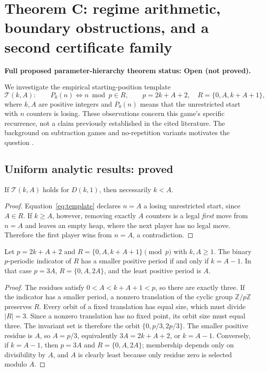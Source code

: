 \section{Theorem C: regime arithmetic, boundary obstructions, and a second certificate family}\label{sec:C}
\textbf{Full proposed parameter-hierarchy theorem status: Open (not proved).}

We investigate the empirical starting-position template
\begin{equation}\label{eq:template}
\mathcal{T}(k,A):\qquad P_0(n)\iff n\bmod p\in R,\qquad
p=2k+A+2,\quad R=\{0,A,k+A+1\},
\end{equation}
where $k,A$ are positive integers and $P_0(n)$ means that the unrestricted start with $n$ counters is losing. These observations concern this game's specific recurrence, not a claim previously established in the cited literature. The background on subtraction games and no-repetition variants motivates the question \cite{winningways2001,gurvich2012}.

\subsection{Uniform analytic results: proved}
\begin{proposition}\label{prop:Cupper}
If $\mathcal{T}(k,A)$ holds for $D(k,1)$, then necessarily $k<A$.
\end{proposition}
\begin{proof}
Equation~\eqref{eq:template} declares $n=A$ a losing unrestricted start, since $A\in R$. If $k\ge A$, however, removing exactly $A$ counters is a legal \emph{first} move from $n=A$ and leaves an empty heap, where the next player has no legal move. Therefore the first player wins from $n=A$, a contradiction.
\end{proof}

\begin{proposition}\label{prop:Ccollapse}
Let $p=2k+A+2$ and $R=\{0,A,k+A+1\}\pmod p$ with $k,A\ge1$. The binary $p$-periodic indicator of $R$ has a smaller positive period if and only if $k=A-1$. In that case $p=3A$, $R=\{0,A,2A\}$, and the least positive period is $A$.
\end{proposition}
\begin{proof}
The residues satisfy $0<A<k+A+1<p$, so there are exactly three. If the indicator has a smaller period, a nonzero translation of the cyclic group $\mathbb Z/p\mathbb Z$ preserves $R$. Every orbit of a fixed translation has equal size, which must divide $|R|=3$. Since a nonzero translation has no fixed point, its orbit size must equal three. The invariant set is therefore the orbit $\{0,p/3,2p/3\}$. The smaller positive residue is $A$, so $A=p/3$, equivalently $3A=2k+A+2$, or $k=A-1$. Conversely, if $k=A-1$, then $p=3A$ and $R=\{0,A,2A\}$; membership depends only on divisibility by $A$, and $A$ is clearly least because only residue zero is selected modulo $A$.
\end{proof}

